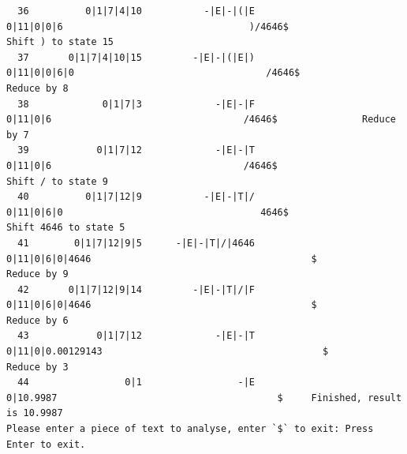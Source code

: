 \documentclass[UTF8]{ctexart}
\begin{document}
\begin{lstlisting}
  36          0|1|7|4|10           -|E|-|(|E                    0|11|0|0|6                                 )/4646$                   Shift ) to state 15
  37       0|1|7|4|10|15         -|E|-|(|E|)                  0|11|0|0|6|0                                  /4646$               Reduce by 8
  38             0|1|7|3             -|E|-|F                      0|11|0|6                                  /4646$               Reduce by 7
  39            0|1|7|12             -|E|-|T                      0|11|0|6                                  /4646$                   Shift / to state 9
  40          0|1|7|12|9           -|E|-|T|/                    0|11|0|6|0                                   4646$                   Shift 4646 to state 5
  41        0|1|7|12|9|5      -|E|-|T|/|4646               0|11|0|6|0|4646                                       $               Reduce by 9
  42       0|1|7|12|9|14         -|E|-|T|/|F               0|11|0|6|0|4646                                       $               Reduce by 6
  43            0|1|7|12             -|E|-|T             0|11|0|0.00129143                                       $               Reduce by 3
  44                 0|1                 -|E                     0|10.9987                                       $     Finished, result is 10.9987
Please enter a piece of text to analyse, enter `$` to exit: Press Enter to exit.
    \end{lstlisting}
\end{document}
